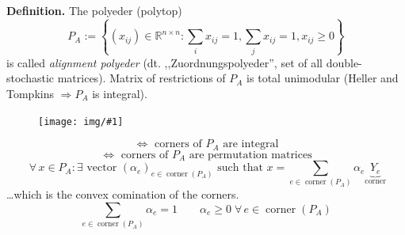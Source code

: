 \documentclass[a4paper]{article}
\theoremstyle{definition}
\newcommand{\drawing}[1]{%
 \begin{figure}[t]
  \begin{center}
   \texttt{[image: img/\#1]}
  \end{center}
 \end{figure}
}
\newcommand{\set}[1]{\left\{#1\right\}}
\newcommand{\fall}{\;\forall\,}
\begin{document}
\textbf{Definition.}
  The polyeder (polytop)
  \[ P_A := \set{(x_{ij}) \in \mathbb{R}^{n\times n}: \sum_i x_{ij} = 1, \sum_j x_{ij} = 1, x_{ij} \geq 0} \]
  is called \emph{alignment polyeder} (dt. ,,Zuordnungspolyeder'', set of all double-stochastic matrices).
  Matrix of restrictions of $P_A$ is total unimodular (Heller and Tompkins $\Rightarrow P_A$ is integral).
  \drawing{assignment_polyeder.pdf}
  \[ \Leftrightarrow \text{ corners of } P_A \text{ are integral} \]
  \[ \Leftrightarrow \text{ corners of } P_A \text{ are permutation matrices} \]
  \[ \fall x \in P_A: \exists \text{ vector } (\alpha_e)_{e \in \operatorname{corner}(P_A)} \text{ such that } x = \sum_{e \in \operatorname{corner}(P_A)} \alpha_e \underbrace{Y_e}_{\operatorname{corner}} \]
  \dots which is the convex comination of the corners.
  \[ \sum_{e\in\operatorname{corner}(P_A)} \alpha_e = 1 \qquad \alpha_e \geq 0 \fall e \in \operatorname{corner}(P_A) \]
\end{document}
